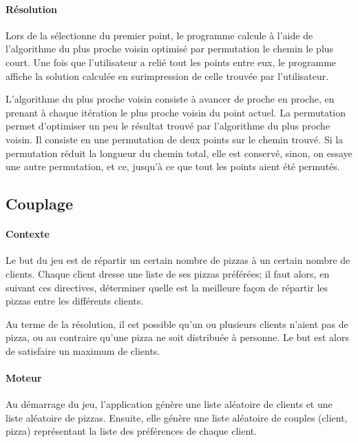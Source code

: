         \paragraph{Résolution}
            Lors de la sélectionne du premier point,
            le programme calcule à l'aide de l'algorithme
            du plus proche voisin optimisé par permutation
            le chemin le plus court.
            Une fois que l'utilisateur a relié tout les points
            entre eux, le programme affiche la solution calculée
            en surimpression de celle trouvée par l'utilisateur.

            L'algorithme du plus proche voisin consiste à avancer
            de proche en proche, en prenant à chaque itération le plus
            proche voisin du point actuel.
            La permutation permet d'optimiser un peu le résultat trouvé
            par l'algorithme du plus proche voisin.
            Il consiste en une permutation de deux points sur le chemin trouvé.
            Si la permutation réduit la longueur du chemin total,
            elle est conservé, sinon, on essaye une autre permutation,
            et ce, jusqu'à ce que tout les points aient été permutés.

	\subsection{Couplage}
		\paragraph{Contexte}
			Le but du jeu est de répartir un certain nombre de pizzas à un certain nombre de
			 clients. Chaque client dresse une liste de ses pizzas préférées; il faut alors,
			 en suivant ces directives, déterminer quelle est la meilleure façon de répartir
			 les pizzas entre les différents clients.

			Au terme de la résolution, il est possible qu'un ou plusieurs clients n'aient pas
			 de pizza, ou au contraire qu'une pizza ne soit distribuée à personne. Le but est
			 alors de satisfaire un maximum de clients.
		\paragraph{Moteur}
			Au démarrage du jeu, l'application génère une liste aléatoire de clients et une
			 liste aléatoire de pizzas. Ensuite, elle génère une liste aléatoire de couples
			 (client, pizza) représentant la liste des préférences de chaque client.
